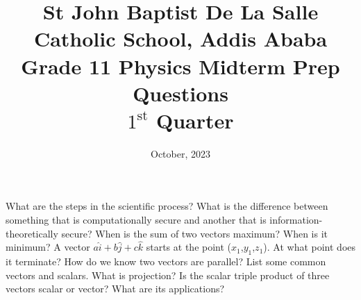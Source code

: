 \documentclass[12pt,addpoints]{exam}
\date{October, 2023}
\begin{document}
	\title{St John Baptist De La Salle Catholic School, Addis Ababa\\
		\large Grade 11 Physics Midterm Prep Questions\\
		$1^\text{st}$ Quarter}
	\maketitle
		\begin{questions}
					\question What are the steps in the scientific process?
					\question What is the difference between something that is computationally secure and another that is information-theoretically secure?
					\question When is the sum of two vectors maximum? When is it minimum?
					\question A vector $a\hat i+b\hat j+ c\hat k$ starts at the point ($x_1$,$y_1$,$z_1$). At what point does it terminate?
					\question How do we know two vectors are parallel?
					\question List some common vectors and scalars.
					\question What is projection?
					\question Is the scalar triple product of three vectors scalar or vector? What are its applications?
					\end{questions}
			
\end{document}
